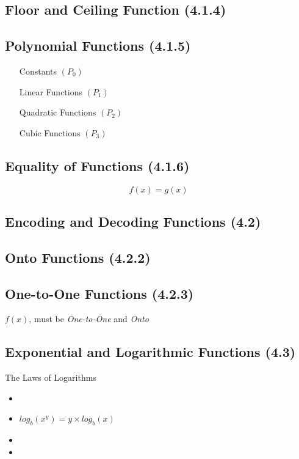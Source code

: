 \documentclass[]{report}
\begin{document}
\subsection*{Floor and Ceiling Function (4.1.4)}
\subsection*{Polynomial Functions (4.1.5)}

\begin{itemize}
\item[Constants] $(P_0)$
\item[Linear Functions] $(P_1)$
\item[Quadratic Functions] $(P_2)$
\item[Cubic Functions] $(P_3)$
\end{itemize}


\subsection*{Equality of Functions (4.1.6)}
\[f(x) = g(x) \]


\subsection*{Encoding and Decoding Functions (4.2)}


\subsection*{Onto Functions (4.2.2)}

\subsection*{One-to-One Functions (4.2.3)}
$f(x)$, must be \emph{One-to-One} and \emph{Onto}



\subsection*{Exponential and Logarithmic Functions (4.3)}

The Laws of Logarithms
\begin{itemize}
\item
\item $log_b(x^y) = y \times log_b(x)$
\item
\item
\end{itemize}
\end{document}
